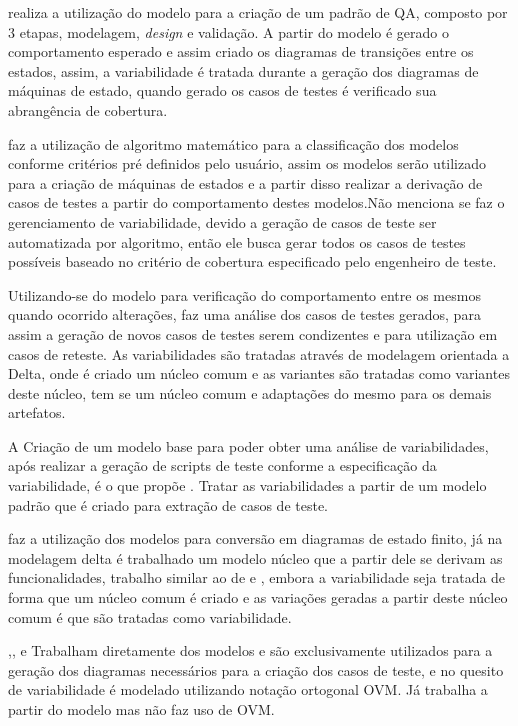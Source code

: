 \cite{devroey2012vision} realiza a utilização do modelo para a criação de um padrão de QA, composto por 3 etapas, modelagem, \textit{design} e validação. A partir do modelo é gerado o comportamento esperado e assim criado os diagramas de transições entre os estados, assim, a variabilidade é tratada durante a geração dos diagramas de máquinas de estado, quando gerado os casos de testes é verificado sua abrangência de cobertura.

\cite{devroey2014abstract} faz a utilização de algoritmo matemático para a classificação dos modelos conforme critérios pré definidos pelo usuário, assim os modelos serão utilizado para a criação de máquinas de estados e a partir disso realizar a derivação de casos de testes a partir do comportamento destes modelos.Não menciona se faz o gerenciamento de variabilidade, devido a geração de casos de teste ser automatizada por algoritmo, então ele busca gerar todos os casos de testes possíveis baseado no critério de cobertura especificado pelo engenheiro de teste.

Utilizando-se do modelo para verificação do comportamento entre os mesmos quando ocorrido alterações,\cite{lity2016applying} faz uma análise dos casos de testes gerados, para assim a geração de novos casos de testes serem condizentes e para utilização em casos de reteste.
As variabilidades são tratadas através de modelagem orientada a Delta, onde é criado um núcleo comum e as variantes são tratadas como variantes deste núcleo, tem se um núcleo comum e adaptações do mesmo para os demais artefatos.

A Criação de um modelo base para poder obter uma análise de variabilidades, após realizar a geração de scripts de teste conforme a especificação da variabilidade, é o que propõe \cite{patel2015automated}. Tratar as variabilidades a partir de um modelo padrão que é criado para extração de casos de teste.

\cite{varshosaz2015delta} faz a utilização dos modelos para conversão em diagramas de estado finito, já na modelagem delta é trabalhado um modelo núcleo que a partir dele se derivam as funcionalidades, trabalho similar ao de \cite{lity2016applying} e \cite{lochau2012incremental}, embora a variabilidade seja tratada de forma que um núcleo comum é criado e as variações geradas a partir deste núcleo comum é que são tratadas como variabilidade.

\cite{reales2011model},\cite{lochau2012parameterized}, \cite{lamancha2009automated} e \cite{samih2012relating} Trabalham diretamente dos modelos e são exclusivamente utilizados para a geração dos diagramas necessários para a criação dos casos de teste, e no quesito de variabilidade é modelado utilizando notação ortogonal OVM.
Já \cite{weissleder2014evaluation} trabalha a partir do modelo mas não faz uso de OVM.

